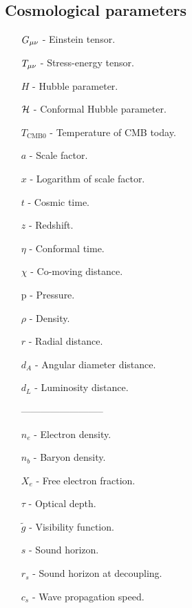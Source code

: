 \subsection*{Cosmological parameters}
\begin{itemize}
    \item[$G_{\mu\nu}$] - Einstein tensor.
    \item[$T_{\mu\nu}$] - Stress-energy tensor.
    \item[$H$] - Hubble parameter.
    \item[$\mathcal{H}$]  - Conformal Hubble parameter.
    \item[$T_{\mathrm{CMB}0}$] - Temperature of CMB today.
    \item[$a$] - Scale factor.
    \item[$x$] - Logarithm of scale factor.
    \item[$t$] - Cosmic time.
    \item[$z$] - Redshift.
    \item[$\eta$] - Conformal time.
    \item[$\chi$] - Co-moving distance. 
    \item[p] - Pressure.
    \item[$\rho$] - Density.
    \item[$r$] - Radial distance.
    \item[$d_A$] - Angular diameter distance.
    \item[$d_L$] - Luminosity distance.
    \item[] --------------------------
    \item[$n_e$] - Electron density.
    \item[$n_b$] - Baryon density. 
    \item[$X_e$] - Free electron fraction.
    \item[$\tau$] - Optical depth.
    \item[$\tilde{g}$] - Visibility function. 
    \item[$s$] - Sound horizon.
    \item[$r_s$] - Sound horizon at decoupling. 
    \item[$c_s$] - Wave propagation speed.
\end{itemize}

